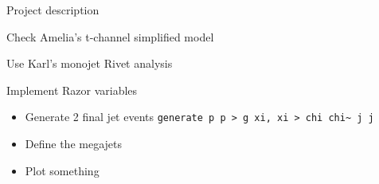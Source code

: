 Project description

Check Amelia's t-channel simplified model

Use Karl's monojet Rivet analysis

Implement Razor variables

\begin{itemize}
	\item Generate 2 final jet events \lstinline|generate p p > g xi, xi > chi chi~ j j|
	\item Define the megajets
	\item Plot something
	
\end{itemize}
